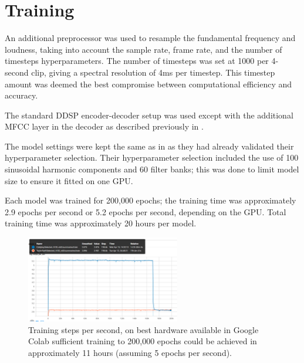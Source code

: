 \section{Training}

An additional preprocessor was used to resample the fundamental frequency and loudness, taking into account the sample rate, frame rate, and the number of timesteps hyperparameters. The number of timesteps was set at 1000 per 4-second clip, giving a spectral resolution of 4ms per timestep. This timestep amount was deemed the best compromise between computational efficiency and accuracy.

The standard DDSP encoder-decoder setup was used except with the additional MFCC layer in the decoder as described previously in .

The model settings were kept the same as in  as they had already validated their hyperparameter selection. Their hyperparameter selection included the use of 100 sinusoidal harmonic components and 60 filter banks; this was done to limit model size to ensure it fitted on one GPU.

Each model was trained for 200,000 epochs; the training time was approximately 2.9 epochs per second or 5.2 epochs per second, depending on the GPU. Total training time was approximately 20 hours per model.

\begin{figure}[H]
    \centering
    \includegraphics[width=0.6\textwidth]{research/training/StepsPerSecond.png}
    \caption{Training steps per second, on best hardware available in Google Colab sufficient training to 200,000 epochs could be achieved in approximately 11 hours (assuming 5 epochs per second).}
\end{figure}

